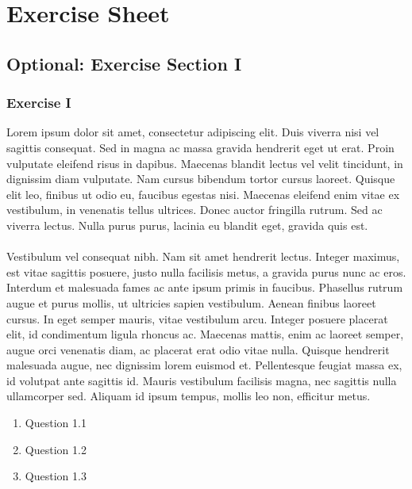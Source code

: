 \documentclass[12pt,oneside]{article}
\begin{document}
\section*{Exercise Sheet \thesection}
\pagestyle{fancy}
\fancyhf{}


\subsection*{Optional: Exercise Section I}
\subsubsection*{Exercise I}

Lorem ipsum dolor sit amet, consectetur adipiscing elit. Duis viverra nisi vel sagittis consequat. Sed in magna ac massa gravida hendrerit eget ut erat. Proin vulputate eleifend risus in dapibus. Maecenas blandit lectus vel velit tincidunt, in dignissim diam vulputate. Nam cursus bibendum tortor cursus laoreet. Quisque elit leo, finibus ut odio eu, faucibus egestas nisi. Maecenas eleifend enim vitae ex vestibulum, in venenatis tellus ultrices. Donec auctor fringilla rutrum. Sed ac viverra lectus. Nulla purus purus, lacinia eu blandit eget, gravida quis est.\\
\\
\noindent Vestibulum vel consequat nibh. Nam sit amet hendrerit lectus. Integer maximus, est vitae sagittis posuere, justo nulla facilisis metus, a gravida purus nunc ac eros. Interdum et malesuada fames ac ante ipsum primis in faucibus. Phasellus rutrum augue et purus mollis, ut ultricies sapien vestibulum. Aenean finibus laoreet cursus. In eget semper mauris, vitae vestibulum arcu. Integer posuere placerat elit, id condimentum ligula rhoncus ac. Maecenas mattis, enim ac laoreet semper, augue orci venenatis diam, ac placerat erat odio vitae nulla. Quisque hendrerit malesuada augue, nec dignissim lorem euismod et. Pellentesque feugiat massa ex, id volutpat ante sagittis id. Mauris vestibulum facilisis magna, nec sagittis nulla ullamcorper sed. Aliquam id ipsum tempus, mollis leo non, efficitur metus.
\begin{enumerate}
\item Question 1.1
\item Question 1.2
\item Question 1.3
\end{enumerate}

\clearpage
\end{document}
